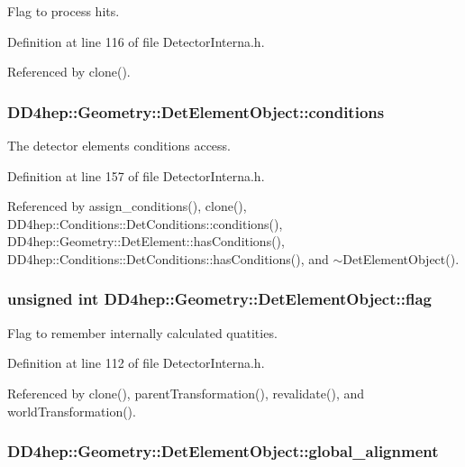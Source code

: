 Flag to process hits. 

Definition at line 116 of file DetectorInterna.h.

Referenced by clone().\hypertarget{class_d_d4hep_1_1_geometry_1_1_det_element_object_a80cf81ef1cd6f9f3d29865dee64ceaca}{
\subsubsection[{conditions}]{ {\bf DD4hep::Geometry::DetElementObject::conditions}}}
\label{class_d_d4hep_1_1_geometry_1_1_det_element_object_a80cf81ef1cd6f9f3d29865dee64ceaca}


The detector elements conditions access. 

Definition at line 157 of file DetectorInterna.h.

Referenced by assign\_\-conditions(), clone(), DD4hep::Conditions::DetConditions::conditions(), DD4hep::Geometry::DetElement::hasConditions(), DD4hep::Conditions::DetConditions::hasConditions(), and $\sim$DetElementObject().\hypertarget{class_d_d4hep_1_1_geometry_1_1_det_element_object_abcab90748d7423310fbf73fcc54cef47}{
\subsubsection[{flag}]{\setlength{\rightskip}{0pt plus 5cm}unsigned int {\bf DD4hep::Geometry::DetElementObject::flag}}}
\label{class_d_d4hep_1_1_geometry_1_1_det_element_object_abcab90748d7423310fbf73fcc54cef47}


Flag to remember internally calculated quatities. 

Definition at line 112 of file DetectorInterna.h.

Referenced by clone(), parentTransformation(), revalidate(), and worldTransformation().\hypertarget{class_d_d4hep_1_1_geometry_1_1_det_element_object_a5f3e0ea44d06a48a4ba4525754f6ef03}{
\subsubsection[{global\_\-alignment}]{ {\bf DD4hep::Geometry::DetElementObject::global\_\-alignment}}}
\label{class_d_d4hep_1_1_geometry_1_1_det_element_object_a5f3e0ea44d06a48a4ba4525754f6ef03}


